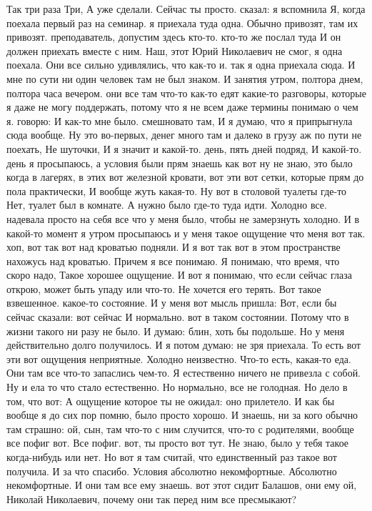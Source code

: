 Так три раза Три, А уже сделали.
Сейчас ты просто.
сказал: я вспомнила Я, когда поехала первый раз на семинар. я приехала туда одна. Обычно привозят,
там их привозят.
преподаватель, допустим здесь кто-то. кто-то же послал туда И он должен приехать вместе с ним. Наш, этот Юрий Николаевич не смог, я одна поехала. Они все сильно удивлялись, что как-то и.
так я одна приехала сюда.
И мне по сути ни один человек там не был знаком.
И занятия утром, полтора днем, полтора часа вечером. они все там что-то как-то едят какие-то разговоры, которые я даже не могу поддержать, потому что я не всем даже термины понимаю о чем я.
говорю: И как-то мне было.
смешновато там, И я думаю, что я припрыгнула сюда вообще. Ну это во-первых, денег много там и далеко в грузу аж по пути не поехать, Не шуточки, И я значит и какой-то.
день, пять дней подряд, И какой-то.
день я просыпаюсь, а условия были прям знаешь как вот ну не знаю, это было когда в лагерях, в этих вот железной кровати, вот эти вот сетки, которые прям до пола практически,
И вообще жуть какая-то.
Ну вот в столовой туалеты где-то Нет, туалет был в комнате.
А нужно было где-то туда идти.
Холодно все.
надевала просто на себя все что у меня было, чтобы не замерзнуть холодно. И в какой-то момент я утром просыпаюсь и у меня такое ощущение что
меня вот так.
хоп, вот так вот над кроватью подняли.
И я вот так вот в этом пространстве нахожусь над кроватью.
Причем я все понимаю.
Я понимаю, что время, что скоро надо, Такое хорошее ощущение.
И вот я понимаю, что если сейчас глаза открою, может быть упаду или что-то.
Не хочется его терять.
Вот такое взвешенное.
какое-то состояние.
И у меня вот мысль пришла:
Вот, если бы сейчас сказали: вот сейчас И нормально. вот в таком состоянии.
Потому что в жизни такого ни разу не было.
И думаю: блин, хоть бы подольше.
Но у меня действительно долго получилось.
И я потом думаю: не зря приехала.
То есть вот эти вот ощущения неприятные.
Холодно неизвестно.
Что-то есть, какая-то еда.
Они там все что-то запаслись чем-то.
Я естественно ничего не привезла с собой.
Ну и ела то что стало естественно.
Но нормально, все не голодная.
Но дело в том, что вот:
А ощущение которое ты не ожидал: оно прилетело.
И как бы вообще я до сих пор помню, было просто хорошо.
И знаешь, ни за кого обычно там страшно: ой, сын, там что-то с ним случится, что-то с родителями, вообще все пофиг вот.
Все пофиг. вот, ты просто вот тут.
Не знаю, было у тебя такое когда-нибудь или нет.
Но вот я там считай, что единственный раз такое вот получила.
И за что спасибо.
Условия абсолютно некомфортные.
Абсолютно некомфортные.
И они там все ему знаешь. вот этот сидит Балашов, они ему ой, Николай Николаевич, почему они так перед ним все пресмыкают?
